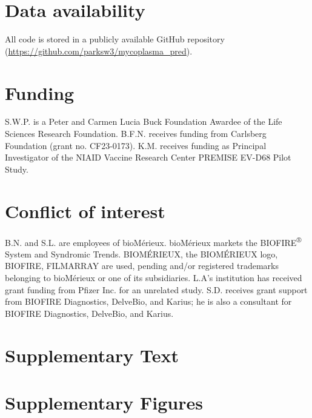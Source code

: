 \documentclass[12pt]{article}
\begin{document}
\section*{Data availability}

All code is stored in a publicly available GitHub repository (\url{https://github.com/parksw3/mycoplasma_pred}).

\section*{Funding}

S.W.P. is a Peter and Carmen Lucia Buck Foundation Awardee of the Life Sciences Research Foundation.
B.F.N. receives funding from Carlsberg Foundation (grant no. CF23-0173).
K.M. receives funding as Principal Investigator of the NIAID Vaccine Research Center PREMISE EV-D68 Pilot Study.

\section*{Conflict of interest}

B.N. and S.L. are employees of bioMérieux.
bioMérieux markets the BIOFIRE\textsuperscript{®} System and Syndromic Trends. 
BIOMÉRIEUX, the BIOMÉRIEUX logo, BIOFIRE, FILMARRAY are used, pending and/or registered trademarks belonging to bioMérieux or one of its subsidiaries.
L.A's institution has received grant funding from Pfizer Inc. for an unrelated study.
S.D. receives grant support from BIOFIRE Diagnostics, DelveBio, and Karius; he is also a consultant for BIOFIRE Diagnostics, DelveBio, and Karius.

\pagebreak

\section*{Supplementary Text}
\setcounter{figure}{0}
\setcounter{equation}{0}
\renewcommand{\thefigure}{S\arabic{figure}}
\renewcommand{\theequation}{S\arabic{equation}}

\section*{Supplementary Figures}
\end{document}
